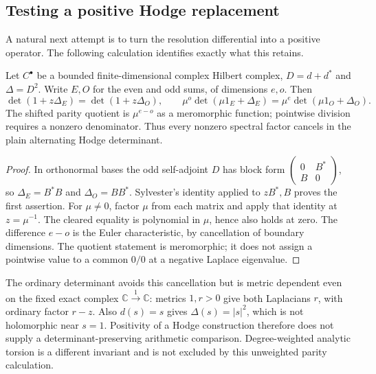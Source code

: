 \subsection{Testing a positive Hodge replacement}
A natural next attempt is to turn the resolution differential into a positive operator. The following calculation identifies exactly what this retains.
\begin{theorem}\label{thm:hodge-cancel}
Let $C^\bullet$ be a bounded finite-dimensional complex Hilbert complex, $D=d+d^*$ and $\Delta=D^2$. Write $E,O$ for the even and odd sums, of dimensions $e,o$. Then
\[
 \det(1+z\Delta_E)=\det(1+z\Delta_O),\qquad
 \mu^o\det(\mu1_E+\Delta_E)=\mu^e\det(\mu1_O+\Delta_O).
\]
The shifted parity quotient is $\mu^{e-o}$ as a meromorphic function; pointwise division requires a nonzero denominator. Thus every nonzero spectral factor cancels in the plain alternating Hodge determinant.
\end{theorem}
\begin{proof}
In orthonormal bases the odd self-adjoint $D$ has block form
$\left(\begin{smallmatrix}0&B^*\\B&0\end{smallmatrix}\right)$, so $\Delta_E=B^*B$ and $\Delta_O=BB^*$. Sylvester's identity applied to $zB^*,B$ proves the first assertion. For $\mu\ne0$, factor $\mu$ from each matrix and apply that identity at $z=\mu^{-1}$. The cleared equality is polynomial in $\mu$, hence also holds at zero. The difference $e-o$ is the Euler characteristic, by cancellation of boundary dimensions. The quotient statement is meromorphic; it does not assign a pointwise value to a common $0/0$ at a negative Laplace eigenvalue.
\end{proof}
The ordinary determinant avoids this cancellation but is metric dependent even on the fixed exact complex $\mathbb C\xrightarrow{1}\mathbb C$: metrics $1,r>0$ give both Laplacians $r$, with ordinary factor $r-z$. Also $d(s)=s$ gives $\Delta(s)=|s|^2$, which is not holomorphic near $s=1$. Positivity of a Hodge construction therefore does not supply a determinant-preserving arithmetic comparison. Degree-weighted analytic torsion \cite{RaySinger} is a different invariant and is not excluded by this unweighted parity calculation.

